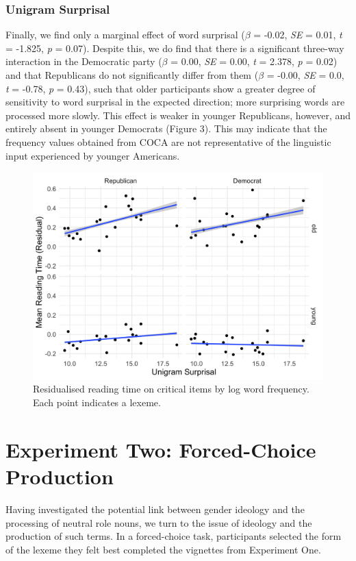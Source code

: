 \documentclass[10pt,letterpaper]{article}
\begin{document}
	\subsubsection{Unigram Surprisal}
	Finally, we find only a marginal effect of word surprisal ($\beta$ = -0.02, \textit{SE} = 0.01, \textit{t} = -1.825, \textit{p} = 0.07). Despite this, we do find that there is a significant three-way interaction in the Democratic party ($\beta$ = 0.00, \textit{SE} = 0.00, \textit{t} = 2.378, \textit{p} = 0.02) and that Republicans do not significantly differ from them ($\beta$ = -0.00, \textit{SE} = 0.0, \textit{t} = -0.78, \textit{p} = 0.43), such that older participants show a greater degree of sensitivity to word surprisal in the expected direction; more surprising words are processed more slowly. This effect is weaker in younger Republicans, however, and entirely absent in younger Democrats (Figure 3). This may indicate that the frequency values obtained from COCA are not representative of the linguistic input experienced by younger Americans.
	
	\begin{figure}[h!]
		\centering
		\includegraphics[scale=0.115]{proc-freq-party.png}
		\caption{Residualised reading time on critical items by log word frequency. Each point indicates a lexeme.}
	\end{figure}
	
	\section{Experiment Two: Forced-Choice Production}
	Having investigated the potential link between gender ideology and the processing of neutral role nouns, we turn to the issue of ideology and the production of such terms. In a forced-choice task, participants selected the form of the lexeme they felt best completed the vignettes from Experiment One.
	
\end{document}
